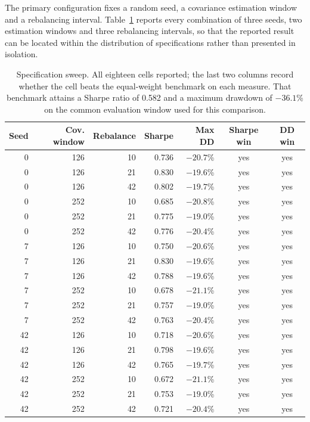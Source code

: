 The primary configuration fixes a random seed, a covariance estimation window and a
rebalancing interval. Table~\ref{tab:sweep} reports every combination of three seeds, two estimation
windows and three rebalancing intervals, so that the reported result can be located
within the distribution of specifications rather than presented in isolation.

\begin{table}[!ht]
\centering
\caption{Specification sweep. All eighteen cells reported; the last two columns record
whether the cell beats the equal-weight benchmark on each measure. That benchmark attains
a Sharpe ratio of 0.582 and a maximum drawdown of $-36.1$\% on the common evaluation
window used for this comparison.}
\label{tab:sweep}
\small
\begin{tabular}{rrrrrcc}
\hline
\textbf{Seed} & \textbf{Cov. window} & \textbf{Rebalance} & \textbf{Sharpe} & \textbf{Max DD} & \textbf{Sharpe win} & \textbf{DD win} \\
\hline
0 & 126 & 10 & 0.736 & $-20.7$\% & yes & yes \\
0 & 126 & 21 & 0.830 & $-19.6$\% & yes & yes \\
0 & 126 & 42 & 0.802 & $-19.7$\% & yes & yes \\
0 & 252 & 10 & 0.685 & $-20.8$\% & yes & yes \\
0 & 252 & 21 & 0.775 & $-19.0$\% & yes & yes \\
0 & 252 & 42 & 0.776 & $-20.4$\% & yes & yes \\
7 & 126 & 10 & 0.750 & $-20.6$\% & yes & yes \\
7 & 126 & 21 & 0.830 & $-19.6$\% & yes & yes \\
7 & 126 & 42 & 0.788 & $-19.6$\% & yes & yes \\
7 & 252 & 10 & 0.678 & $-21.1$\% & yes & yes \\
7 & 252 & 21 & 0.757 & $-19.0$\% & yes & yes \\
7 & 252 & 42 & 0.763 & $-20.4$\% & yes & yes \\
42 & 126 & 10 & 0.718 & $-20.6$\% & yes & yes \\
42 & 126 & 21 & 0.798 & $-19.6$\% & yes & yes \\
42 & 126 & 42 & 0.765 & $-19.7$\% & yes & yes \\
42 & 252 & 10 & 0.672 & $-21.1$\% & yes & yes \\
42 & 252 & 21 & 0.753 & $-19.0$\% & yes & yes \\
42 & 252 & 42 & 0.721 & $-20.4$\% & yes & yes \\
\hline
\end{tabular}
\end{table}

